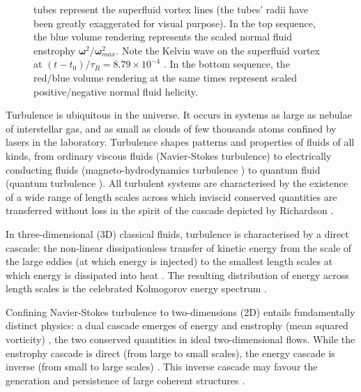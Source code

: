 \documentclass[%
 reprint,
 amsmath,amssymb,
 aps,
 prl,
]{revtex4-2}
\newcommand{\bom}{\boldsymbol{\omega}}
\def\magenta#1{\textcolor{magenta}{#1}}
\begin{document}
\begin{figure}
{tubes represent the superfluid vortex lines (the tubes’ radii have been 
greatly exaggerated for visual purpose). In the top sequence,
the blue volume rendering represents the scaled normal fluid enstrophy 
$\bom^2/\bom^2_{max}$. Note the Kelvin wave on the superfluid
vortex at $(t-t_0)/\tau_R=8.79\times10^{-4}$ . In the bottom sequence, the red/blue volume
rendering at the same times represent scaled positive/negative normal fluid
helicity.	
}
    \label{fig:visualisation}
\end{figure}

Turbulence is ubiquitous in the universe.  It occurs in systems
as large as nebulae of interstellar gas, and as small as clouds of
few thousands atoms confined by lasers in the laboratory.
Turbulence shapes patterns and properties of fluids of all
kinds, from ordinary
 viscous fluids (Navier-Stokes turbulence\cite{frisch1995}) 
to electrically conducting fluids (magneto-hydrodynamics turbulence
\cite{canuto-dalsgaard-1998}) to quantum fluid
(quantum turbulence \cite{barenghi-etal-2023,
Barenghi_Skrbek_Sreenivasan_2023}).
All turbulent systems are characterised by 
the existence of a wide range 
of length scales across which inviscid conserved quantities 
are transferred without loss in the spirit of the cascade 
depicted by Richardson \cite{richardson1922weather}. 

In three-dimensional (3D) classical fluids, turbulence 
is characterised by a direct cascade: the
non-linear dissipationless transfer of kinetic energy from the scale of
the large eddies (at which energy is injected) to the smallest length scales
at which energy is dissipated into heat
\cite{richardson1922weather,kolmogorov-1941}. 
The resulting distribution of energy across length scales is
the celebrated Kolmogorov energy spectrum 
\cite{kolmogorov-1941,frisch1995}. 

Confining Navier-Stokes turbulence to two-dimensions (2D) entails 
fundamentally distinct physics: a dual cascade emerges of energy and enstrophy 
(mean squared vorticity) \cite{kraichnan-1967,boffetta-ecke-2012}, 
the two conserved quantities in ideal two-dimensional flows.
While the enstrophy cascade is direct (from large to small
scales), the energy cascade is inverse (from small to large scales)
\cite{boffetta-musacchio-2010}. This inverse cascade 
may favour the generation and persistence of large coherent 
structures \cite{laurie-etal-2014}. 
\end{document}
